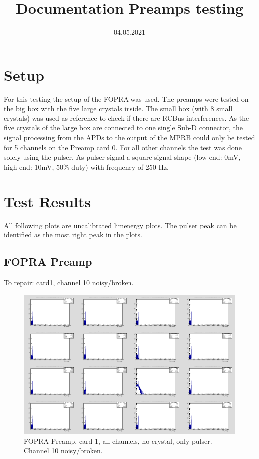 \documentclass{report}
\title{Documentation Preamps testing}
\date{04.05.2021}
\begin{document}
\maketitle




\section{Setup}
For this testing the setup of the FOPRA was used. The preamps were tested on the big box with the five large crystals inside. The small box (with 8 small crystals) was used as reference to check if there are RCBus interferences. As the five crystals of the large box are connected to one single Sub-D connector, the signal processing from the APDs to the output of the MPRB could only be tested for 5 channels on the Preamp card 0. For all other channels the test was done solely using the pulser. As pulser signal a square signal shape (low end: 0mV, high end: 10mV, 50\% duty) with frequency of 250 Hz.


\newpage

\section{Test Results} \label{documentclasses}
All following plots are uncalibrated lim\textunderscore energy plots. The pulser peak can be identified as the most right peak in the plots. 
\subsection{FOPRA Preamp}
To repair: card1, channel 10 noisy/broken.
\begin{figure}[!htb]
  \includegraphics[width=\linewidth]{fopra_preamp_lim_energy_card1_all.png}
  \caption{FOPRA Preamp, card 1, all channels, no crystal, only pulser. Channel 10 noisy/broken.}
\end{figure}
\end{document}
